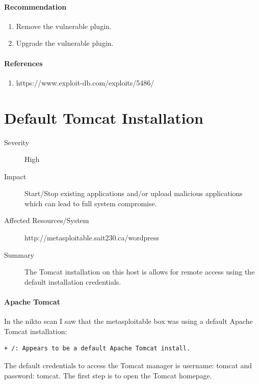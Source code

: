 \documentclass{article}
\begin{document}
\paragraph{Recommendation}

\begin{enumerate}
  \item Remove the vulnerable plugin.
  \item Upgrade the vulnerable plugin.
\end{enumerate}

\paragraph{References}

\begin{enumerate}
  \item https://www.exploit-db.com/exploits/5486/
\end{enumerate}

\newpage
\section{Default Tomcat Installation}

\begin{description}
  \item[Severity] High
  \item[Impact] Start/Stop existing applications and/or upload malicious applications which can lead to full system compromise.
  \item[Affected Resources/System] http://metasploitable.sait230.ca/wordpress
  \item[Summary] The Tomcat installation on this host is allows for remote access using the default installation credentials.
\end{description}

\paragraph{Apache Tomcat}
In the nikto scan I saw that the metasploitable box was using a default Apache
Tomcat installation:

\begin{lstlisting}
+ /: Appears to be a default Apache Tomcat install.
\end{lstlisting}

The default credentials to access the Tomcat manager is username: tomcat and password: tomcat.
The first step is to open the Tomcat homepage.
\end{document}
